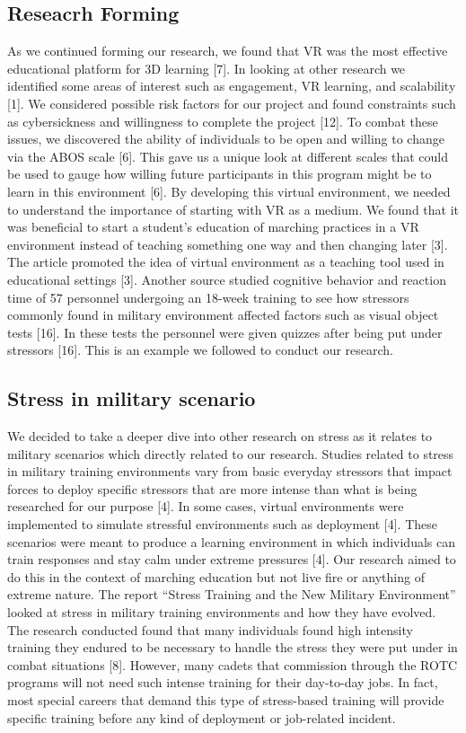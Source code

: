 \documentclass[manuscript,screen,review]{acmart}
\begin{document}
\subsection{Reseacrh Forming}
As we continued forming our research, we found that VR was the most effective educational 
platform for 3D learning [7]. In looking at other research we identified some areas of 
interest such as engagement, VR learning, and scalability [1]. We considered possible 
risk factors for our project and found constraints such as cybersickness and willingness 
to complete the project [12]. To combat these issues, we discovered the ability of 
individuals to be open and willing to change via the ABOS scale [6]. This gave us a 
unique look at different scales that could be used to gauge how willing future participants 
in this program might be to learn in this environment [6]. By developing this virtual 
environment, we needed to understand the importance of starting with VR as a medium. We 
found that it was beneficial to start a student's education of marching practices in 
a VR environment instead of teaching something one way and then changing later [3]. 
The article promoted the idea of virtual environment as a teaching tool used in 
educational settings [3]. Another source studied cognitive behavior and reaction 
time of 57 personnel undergoing an 18-week training to see how stressors commonly 
found in military environment affected factors such as visual object tests [16]. 
In these tests the personnel were given quizzes after being put under stressors [16]. 
This is an example we followed to conduct our research.   

\subsection{Stress in military scenario}
We decided to take a deeper dive into other research on stress as it relates to military 
scenarios which directly related to our research. Studies related to stress in military 
training environments vary from basic everyday stressors that impact forces to deploy 
specific stressors that are more intense than what is being researched for our purpose [4]. 
In some cases, virtual environments were implemented to simulate stressful environments 
such as deployment [4]. These scenarios were meant to produce a learning environment in 
which individuals can train responses and stay calm under extreme pressures [4]. Our 
research aimed to do this in the context of marching education but not live fire or 
anything of extreme nature. The report “Stress Training and the New Military Environment” 
looked at stress in military training environments and how they have evolved. The research 
conducted found that many individuals found high intensity training they endured to be 
necessary to handle the stress they were put under in combat situations [8]. However, 
many cadets that commission through the ROTC programs will not need such intense training 
for their day-to-day jobs. In fact, most special careers that demand this type of stress-based 
training will provide specific training before any kind of deployment or job-related incident.  
\end{document}
